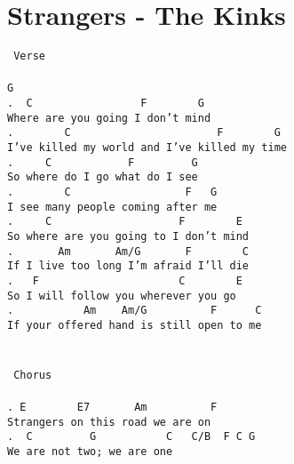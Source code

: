 \newpage
\section{Strangers - The Kinks}
\label{Strangers - The Kinks}
\texttt{\lbrack\ Verse\rbrack\\
\\
G\\
. \ C\ \ \ \ \ \ \ \ \ \ \ \ \ \ \ \ \ F\ \ \ \ \ \ \ \ G\\
Where\ are\ you\ going\ I\ don't\ mind\\
. \ \ \ \ \ \ \ C\ \ \ \ \ \ \ \ \ \ \ \ \ \ \ \ \ \ \ \ \ \ \ F\ \ \ \ \ \ \ \ G\\
I've\ killed\ my\ world\ and\ I've\ killed\ my\ time\\
. \ \ \ \ C\ \ \ \ \ \ \ \ \ \ \ \ F\ \ \ \ \ \ \ \ \ G\\
So\ where\ do\ I\ go\ what\ do\ I\ see\\
. \ \ \ \ \ \ \ C\ \ \ \ \ \ \ \ \ \ \ \ \ \ \ \ \ \ F\ \ \ G\\
I\ see\ many\ people\ coming\ after\ me\\
. \ \ \ \ C\ \ \ \ \ \ \ \ \ \ \ \ \ \ \ \ \ \ \ \ F\ \ \ \ \ \ \ \ E\\
So\ where\ are\ you\ going\ to\ I\ don't\ mind\\
. \ \ \ \ \ \ Am\ \ \ \ \ \ \ Am/G\ \ \ \ \ \ \ F\ \ \ \ \ \ \ \ C\\
If\ I\ live\ too\ long\ I'm\ afraid\ I'll\ die\\
. \ \ F\ \ \ \ \ \ \ \ \ \ \ \ \ \ \ \ \ \ \ \ \ \ C\ \ \ \ \ \ \ \ E\\
So\ I\ will\ follow\ you\ wherever\ you\ go\\
. \ \ \ \ \ \ \ \ \ \ Am\ \ \ \ Am/G\ \ \ \ \ \ \ \ \ \ F\ \ \ \ \ \ C\\
If\ your\ offered\ hand\ is\ still\ open\ to\ me\\
\\
\\
\lbrack\ Chorus\rbrack\\
\\
. E\ \ \ \ \ \ \ \ E7\ \ \ \ \ \ \ Am\ \ \ \ \ \ \ \ \ \ F\\
Strangers\ on\ this\ road\ we\ are\ on\\
. \ C\ \ \ \ \ \ \ \ \ G\ \ \ \ \ \ \ \ \ \ \ C\ \ \ C/B\ \ F\ C\ G\\
We\ are\ not\ two;\ we\ are\ one\\
\\
\\
}

